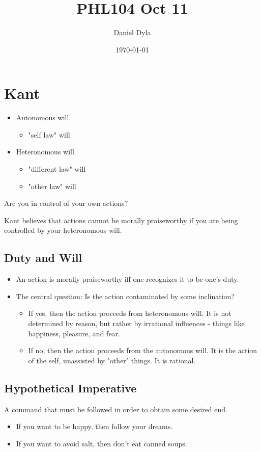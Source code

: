 \documentclass[12pt]{article}
\author{Daniel Dyla}
\date{\today}
\title{PHL104 Oct 11}
\begin{document}
\maketitle

\section{Kant}
\label{sec-1}

\begin{itemize}
\item Autonomous will
\begin{itemize}
\item "self law" will
\end{itemize}
\item Heteronomous will
\begin{itemize}
\item "different law" will
\item "other law" will
\end{itemize}
\end{itemize}

Are you in control of your own actions?

Kant believes that actions cannot be morally praiseworthy if you are
being controlled by your heteronomous will. 

\subsection{Duty and Will}
\label{sec-1-1}

\begin{itemize}
\item An action is morally praiseworthy iff one recognizes it to be one's
duty.
\item The central question: Is the action contaminated by some
inclination?
\begin{itemize}
\item If yes, then the action proceeds from heteronomous will. It is not
determined by reason, but rather by irrational influences - things
like happiness, pleasure, and fear.
\item If no, then the action proceeds from the autonomous will. It is the
action of the self, unassisted by "other" things. It is rational.
\end{itemize}
\end{itemize}

\subsection{Hypothetical Imperative}
\label{sec-1-2}

A command that must be followed in order to obtain some desired end.

\begin{itemize}
\item If you want to be happy, then follow your dreams.
\item If you want to avoid salt, then don't eat canned soups.
\end{itemize}
\end{document}

